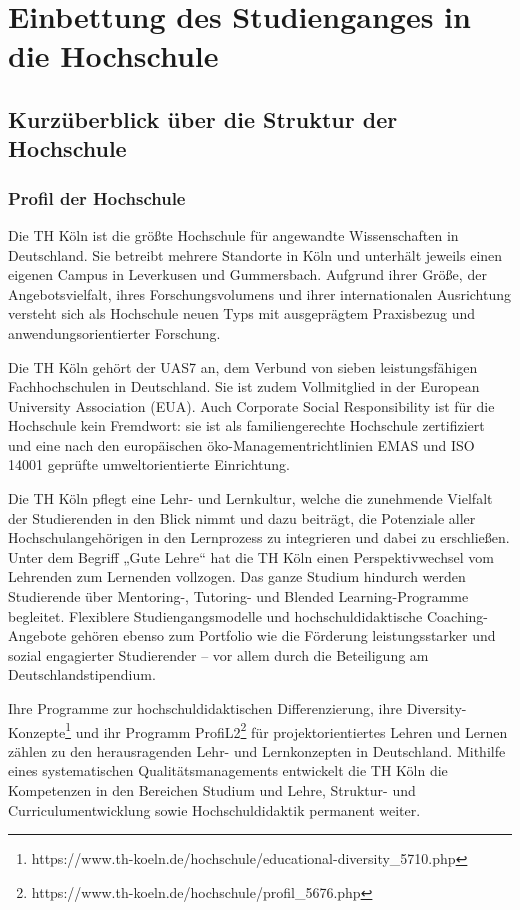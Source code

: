 \chapter{Einbettung des Studienganges in die
Hochschule}\label{einbettung-des-studienganges-in-die-hochschule}

\section{Kurzüberblick über die Struktur der
Hochschule}\label{kurzuxfcberblick-uxfcber-die-struktur-der-hochschule}

\subsection{Profil der Hochschule}\label{profil-der-hochschule}

Die TH Köln ist die größte Hochschule für angewandte Wissenschaften in
Deutschland. Sie betreibt mehrere Standorte in Köln und unterhält
jeweils einen eigenen Campus in Leverkusen und Gummersbach. Aufgrund
ihrer Größe, der Angebotsvielfalt, ihres Forschungsvolumens und ihrer
internationalen Ausrichtung versteht sich als Hochschule neuen Typs mit
ausgeprägtem Praxisbezug und anwendungsorientierter Forschung.

Die TH Köln gehört der UAS7 an, dem Verbund von sieben leistungsfähigen
Fachhochschulen in Deutschland. Sie ist zudem Vollmitglied in der
European University Association (EUA). Auch Corporate Social
Responsibility ist für die Hochschule kein Fremdwort: sie ist als
familiengerechte Hochschule zertifiziert und eine nach den europäischen
öko-Managementrichtlinien EMAS und ISO 14001 geprüfte umweltorientierte
Einrichtung.

Die TH Köln pflegt eine Lehr- und Lernkultur, welche die zunehmende
Vielfalt der Studierenden in den Blick nimmt und dazu beiträgt, die
Potenziale aller Hochschulangehörigen in den Lernprozess zu integrieren
und dabei zu erschließen. Unter dem Begriff „Gute Lehre`` hat die TH
Köln einen Perspektivwechsel vom Lehrenden zum Lernenden vollzogen. Das
ganze Studium hindurch werden Studierende über Mentoring-, Tutoring- und
Blended Learning-Programme begleitet. Flexiblere Studiengangsmodelle und
hochschuldidaktische Coaching-Angebote gehören ebenso zum Portfolio wie
die Förderung leistungsstarker und sozial engagierter Studierender --
vor allem durch die Beteiligung am Deutschlandstipendium.

Ihre Programme zur hochschuldidaktischen Differenzierung, ihre
Diversity-Konzepte\footnote{https://www.th-koeln.de/hochschule/educational-diversity\_5710.php}
und ihr Programm ProfiL2\footnote{https://www.th-koeln.de/hochschule/profil\_5676.php}
für projektorientiertes Lehren und Lernen zählen zu den herausragenden
Lehr- und Lernkonzepten in Deutschland. Mithilfe eines systematischen
Qualitätsmanagements entwickelt die TH Köln die Kompetenzen in den
Bereichen Studium und Lehre, Struktur- und Curriculumentwicklung sowie
Hochschuldidaktik permanent weiter.

